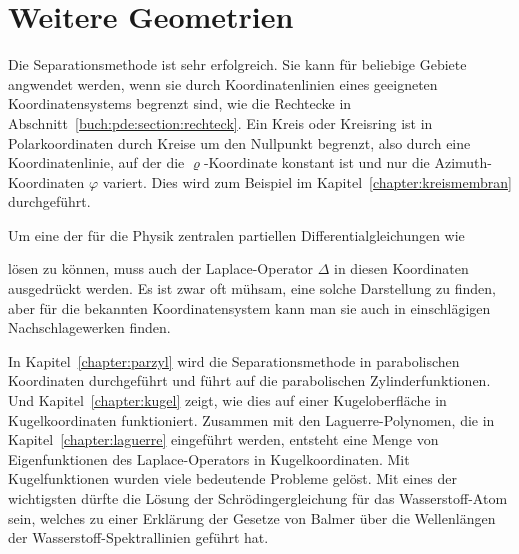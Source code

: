 %
%
%
\section{Weitere Geometrien
\label{buch:pde:section:geometrie}}
Die Separationsmethode ist sehr erfolgreich.
Sie kann für beliebige Gebiete angwendet werden, wenn sie durch
Koordinatenlinien eines geeigneten Koordinatensystems begrenzt sind,
wie die Rechtecke in Abschnitt~\ref{buch:pde:section:rechteck}.
Ein Kreis oder Kreisring ist in Polarkoordinaten durch Kreise
um den Nullpunkt begrenzt, also durch eine Koordinatenlinie, auf
der die $\varrho$-Koordinate konstant ist und nur die Azimuth-Koordinaten
$\varphi$ variert.
Dies wird zum Beispiel im Kapitel~\ref{chapter:kreismembran}
durchgeführt.

Um eine der für die Physik zentralen partiellen Differentialgleichungen
wie
\begin{center}
\end{center}
lösen zu können, muss auch der Laplace-Operator $\Delta$ in diesen
Koordinaten ausgedrückt werden.
Es ist zwar oft mühsam, eine solche Darstellung zu finden, aber
für die bekannten Koordinatensystem kann man sie auch in einschlägigen
Nachschlagewerken finden.

In Kapitel~\ref{chapter:parzyl} wird die Separationsmethode 
in parabolischen Koordinaten durchgeführt und führt auf die parabolischen
Zylinderfunktionen.
Und Kapitel~\ref{chapter:kugel} zeigt, wie dies auf einer Kugeloberfläche
in Kugelkoordinaten funktioniert.
Zusammen mit den Laguerre-Polynomen, die in Kapitel~\ref{chapter:laguerre}
eingeführt werden, entsteht eine Menge von Eigenfunktionen des
Laplace-Operators in Kugelkoordinaten.
Mit Kugelfunktionen wurden viele bedeutende Probleme gelöst.
Mit eines der wichtigsten dürfte die Lösung der Schrödingergleichung
für das Wasserstoff-Atom sein, welches zu einer Erklärung der
Gesetze von Balmer über die Wellenlängen der Wasserstoff-Spektrallinien
geführt hat.

